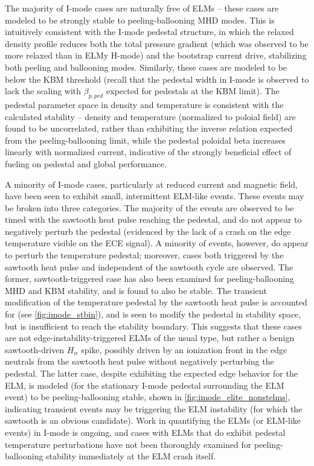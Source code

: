 The majority of I-mode cases are naturally free of ELMs -- these cases are modeled to be strongly stable to peeling-ballooning MHD modes.  This is intuitively consistent with the I-mode pedestal structure, in which the relaxed density profile reduces both the total pressure gradient (which was observed to be more relaxed than in ELMy H-mode) and the bootstrap current drive, stabilizing both peeling and ballooning modes.  Similarly, these cases are modeled to be below the KBM threshold (recall that the pedestal width in I-mode is observed to lack the scaling with $\beta_{p,ped}$ expected for pedestals at the KBM limit).  The pedestal parameter space in density and temperature is consistent with the calculated stability -- density and temperature (normalized to poloial field) are found to be uncorrelated, rather than exhibiting the inverse relation expected from the peeling-ballooning limit, while the pedestal poloidal beta increases linearly with normalized current, indicative of the strongly beneficial effect of fueling on pedestal and global performance.

A minority of I-mode cases, particularly at reduced current and magnetic field, have been seen to exhibit small, intermittent ELM-like events.  These events may be broken into three categories.  The majority of the events are observed to be timed with the sawtooth heat pulse reaching the pedestal, and do not appear to negatively perturb the pedestal (evidenced by the lack of a crash on the edge temperature visible on the ECE signal).  A minority of events, however, do appear to perturb the temperature pedestal; moreover, cases both triggered by the sawtooth heat pulse and independent of the sawtooth cycle are observed.  The former, sawtooth-triggered case has also been examined for peeling-ballooning MHD and KBM stability, and is found to also be stable.  The transient modification of the temperature pedestal by the sawtooth heat pulse is accounted for (see \cref{fig:imode_stbin}), and is seen to modify the pedestal in stability space, but is insufficient to reach the stability boundary.  This suggests that these cases are not edge-instability-triggered ELMs of the usual type, but rather a benign sawtooth-driven $H_\alpha$ spike, possibly driven by an ionization front in the edge neutrals from the sawtooth heat pulse without negatively perturbing the pedestal.  The latter case, despite exhibiting the expected edge behavior for the ELM, is modeled (for the stationary I-mode pedestal surrounding the ELM event) to be peeling-ballooning stable, shown in \cref{fig:imode_elite_nonstelms}, indicating transient events may be triggering the ELM instability (for which the sawtooth is an obvious candidate).  Work in quantifying the ELMs (or ELM-like events) in I-mode is ongoing, and cases with ELMs that do exhibit pedestal temperature perturbations have not been thoroughly examined for peeling-ballooning stability immediately at the ELM crash itself.\nicesectionending

